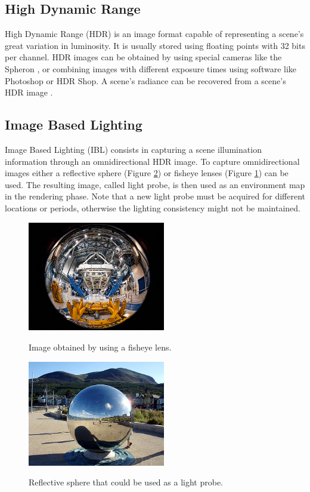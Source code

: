 \documentclass[conference]{acmsiggraph}
\begin{document}
\subsection{High Dynamic Range}

	High Dynamic Range (HDR) is an image format capable of representing a scene’s great variation in luminosity. It is usually stored using floating points with 32 bits per channel. 
	HDR images can be obtained by using special cameras like the Spheron \cite{spheron}, or combining images with different exposure times using software like Photoshop or HDR Shop. 
	A scene’s radiance can be recovered from a scene’s HDR image \cite{debevec1997}.

\subsection{Image Based Lighting}

	Image Based Lighting (IBL) \cite{debevec2002} consists in capturing a scene illumination information through an omnidirectional HDR image. To capture omnidirectional images either 
	a reflective sphere (Figure \ref{fig:lightprobe}\cite{linda2007}) or fisheye lenses (Figure \ref{fig:fisheye}\cite{salgado2010}) can be used. The resulting image, called light probe, is then used as an environment 
	map in the rendering phase. Note that a new light probe must be acquired for different locations or periods, otherwise the lighting consistency might not be maintained.

	\begin{figure}[!ht]
		\caption{Image obtained by using a fisheye lens.}
		\centering
		\includegraphics[width=6cm]{images/fisheye.jpg}
		\label{fig:fisheye}
	\end{figure}

	\begin{figure}[!ht]
		\caption{Reflective sphere that could be used as a light probe.}
		\centering
		\includegraphics[width=6cm]{images/lightprobe.jpg}
		\label{fig:lightprobe}
	\end{figure}
\end{document}
